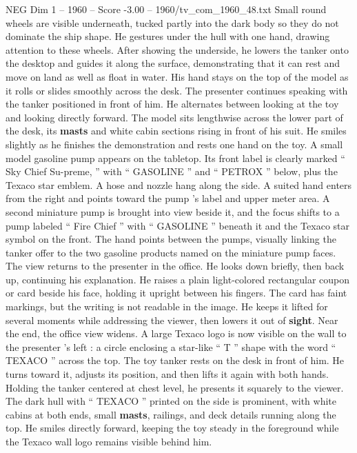 \begin{textsample}{NEG Dim 1 – 1960 – Score -3.00 – 1960/tv\_com\_1960\_48.txt}
Small round wheels are visible underneath, tucked partly into the dark body so they do not dominate the ship shape.
He gestures under the hull with one hand, drawing attention to these wheels.
After showing the underside, he lowers the tanker onto the desktop and guides it along the surface, demonstrating that it can rest and move on land as well as float in water.
His hand stays on the top of the model as it rolls or slides smoothly across the desk.
The presenter continues speaking with the tanker positioned in front of him.
He alternates between looking at the toy and looking directly forward.
The model sits lengthwise across the lower part of the desk, its \textbf{masts} and white cabin sections rising in front of his suit.
He smiles slightly as he finishes the demonstration and rests one hand on the toy.
A small model gasoline pump appears on the tabletop.
Its front label is clearly marked “ Sky Chief Su-preme, ” with “ GASOLINE ” and “ PETROX ” below, plus the Texaco star emblem.
A hose and nozzle hang along the side.
A suited hand enters from the right and points toward the pump ’s label and upper meter area.
A second miniature pump is brought into view beside it, and the focus shifts to a pump labeled “ Fire Chief ” with “ GASOLINE ” beneath it and the Texaco star symbol on the front.
The hand points between the pumps, visually linking the tanker offer to the two gasoline products named on the miniature pump faces.
The view returns to the presenter in the office.
He looks down briefly, then back up, continuing his explanation.
He raises a plain light-colored rectangular coupon or card beside his face, holding it upright between his fingers.
The card has faint markings, but the writing is not readable in the image.
He keeps it lifted for several moments while addressing the viewer, then lowers it out of \textbf{sight}.
Near the end, the office view widens.
A large Texaco logo is now visible on the wall to the presenter ’s left : a circle enclosing a star-like “ T ” shape with the word “ TEXACO ” across the top.
The toy tanker rests on the desk in front of him.
He turns toward it, adjusts its position, and then lifts it again with both hands.
Holding the tanker centered at chest level, he presents it squarely to the viewer.
The dark hull with “ TEXACO ” printed on the side is prominent, with white cabins at both ends, small \textbf{masts}, railings, and deck details running along the top.
He smiles directly forward, keeping the toy steady in the foreground while the Texaco wall logo remains visible behind him.

\end{textsample}
